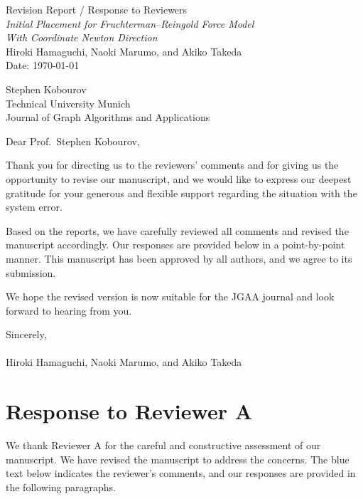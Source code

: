 \documentclass[11pt]{article}
\newcommand{\EditorName}{Stephen Kobourov}
\newcommand{\EditorAffiliation}{Technical University Munich}
\begin{document}
\begin{center}
  {\Large Revision Report / Response to Reviewers}\\[0.75em]
  {\large \emph{Initial Placement for Fruchterman--Reingold Force Model\\ With Coordinate Newton Direction}}\\[0.5em]
  Hiroki Hamaguchi, Naoki Marumo, and Akiko Takeda\\
  Date: \today
\end{center}

\bigskip

\noindent \EditorName\\
\noindent \EditorAffiliation\\
\noindent Journal of Graph Algorithms and Applications

\medskip

\noindent Dear Prof.~\EditorName,

\medskip

Thank you for directing us to the reviewers' comments and for giving us the opportunity to revise our manuscript, and we would like to express our deepest gratitude for your generous and flexible support regarding the situation with the system error.

Based on the reports, we have carefully reviewed all comments and revised the manuscript accordingly.
Our responses are provided below in a point-by-point manner.
This manuscript has been approved by all authors, and we agree to its submission.

We hope the revised version is now suitable for the JGAA journal and look forward to hearing from you.

\medskip

Sincerely,\\
\\
Hiroki Hamaguchi, Naoki Marumo, and Akiko Takeda

\bigskip

\renewcommand{\thesection}{\Alph{section}}

\section{Response to Reviewer A}

We thank Reviewer A for the careful and constructive assessment of our manuscript.
We have revised the manuscript to address the concerns.
The blue text below indicates the reviewer's comments, and our responses are provided in the following paragraphs.
\end{document}
